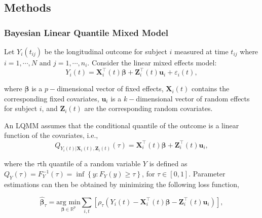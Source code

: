 

\subsection{Methods}\label{sec:p2methods}
\renewcommand{\thesubsubsection}{\thesubsection.\arabic{subsubsection}}
\subsubsection{Bayesian Linear Quantile Mixed Model}\label{sec:p2BLQMM}
Let $Y_{i}(t_{ij})$ be the longitudinal outcome for subject $i$ measured at time $t_{ij}$ where $i=1, \cdots, N\mbox{ and } j=1,\cdots, n_i$. Consider the linear mixed effects model:
\begin{equation}\label{eqn:p2lmm}
Y_{i}(t) ={\boldsymbol X}_{i}^{\top}(t) \boldsymbol{\beta}+ {\boldsymbol Z}_{i}^{\top}(t)\boldsymbol{u}_i + \varepsilon_{i}(t),
\end{equation}

\noindent where $\boldsymbol{\beta}$ is a $p-$dimensional vector of fixed effects,  ${\boldsymbol X}_{i}(t)$ contains the corresponding fixed covariates, $\boldsymbol{u}_i$ is a $k-$dimensional vector of random effects for subject $i$, and ${\boldsymbol Z}_{i}(t)$ are the corresponding random covariates.

An LQMM assumes that the conditional quantile of the outcome is a linear function of the covariates, i.e.,
\begin{equation}\label{eqn:p2lqmm}
Q_{Y_{i}(t)|{\boldsymbol X}_{i}(t),{\boldsymbol Z}_{i}(t)}(\tau)={\boldsymbol X}_{i}^{\top}(t) \boldsymbol{\beta}+ {\boldsymbol Z}_{i}^{\top}(t)\boldsymbol{u}_i,
\end{equation}

\noindent where the $\tau$th quantile of a random variable $Y$ is defined as $Q_{Y}(\tau)=F_{Y}^{-1}(\tau)=\inf\left\{ y:F_{Y}(y)\geq\tau\right\}$, for $\tau\in [0, 1]$. Parameter estimations can then be obtained by minimizing the following loss function,

\begin{equation*}\label{eqn:p2loss_fun}
\hat{\boldsymbol{\beta}}_{\tau}=\underset{\boldsymbol{\beta}\in \mathbb{R}^{p}}{\mbox{arg min}}\sum_{i, t}\left[\rho_{\tau}\left(Y_{i}(t)-{\boldsymbol X}_{i}^{\top}(t)\boldsymbol{\beta} - {\boldsymbol Z}_{i}^{\top}(t)\boldsymbol{u}_i\right)\right],
\end{equation*}

